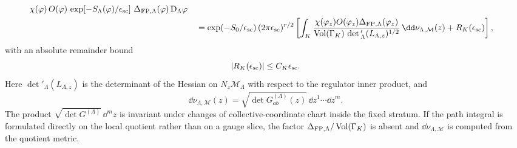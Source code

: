 \begin{theorem}
\begin{align}
    \chi(\varphi)\,O(\varphi)\,
    \exp\!\left[-S_\Lambda(\varphi)/\epsilon_{\rm sc}\right]\,
    \Delta_{\rm FP,\Lambda}(\varphi)\,\mathrm D_\Lambda\varphi
  \nonumber\\
  &\quad =
  \exp(-S_0/\epsilon_{\rm sc})\,
  (2\pi\epsilon_{\rm sc})^{r/2}
  \left[
  \int_K
  \frac{\chi(\varphi_z)O(\varphi_z)\Delta_{\rm FP,\Lambda}(\varphi_z)}
       {\operatorname{Vol}(\Gamma_K)\,
        \det{}'_{\Lambda}(L_{\Lambda,z})^{1/2}}\,
  \dd\nu_{\Lambda,\mathcal M}(z)
  +R_K(\epsilon_{\rm sc})
  \right],
  \label{eq:collective-coordinate-stationary-phase-formula}
\end{align}
with an absolute remainder bound
\[
  |R_K(\epsilon_{\rm sc})|\le C_K\epsilon_{\rm sc}.
\]
Here \(\det{}'_{\Lambda}(L_{\Lambda,z})\) is the determinant of the Hessian on
\(N_z\mathcal M_\Lambda\) with respect to the regulator inner product, and
\begin{equation}
  \dd\nu_{\Lambda,\mathcal M}(z)
  =
  \sqrt{\det G^{(\Lambda)}_{ab}(z)}\,
  \dd z^1\cdots \dd z^m .
  \label{eq:collective-coordinate-bosonic-measure}
\end{equation}
The product
\(\sqrt{\det G^{(\Lambda)}}\,\dd^mz\) is invariant under changes of
collective-coordinate chart inside the fixed stratum.  If the path integral is
formulated directly on the local quotient rather than on a gauge slice, the
factor \(\Delta_{\rm FP,\Lambda}/\operatorname{Vol}(\Gamma_K)\) is absent and
\(\dd\nu_{\Lambda,\mathcal M}\) is computed from the quotient metric.
\end{theorem}

